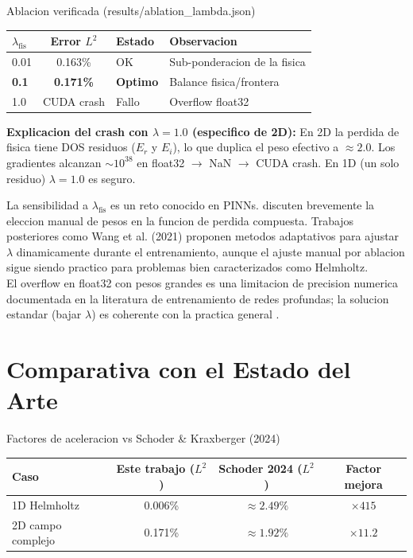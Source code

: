 \documentclass[12pt,a4paper]{article}
\begin{document}
\begin{resultbox}{Ablacion verificada (results/ablation\_lambda.json)}
\begin{tabular}{lcll}
\toprule
$\lambda_\text{fis}$ & Error $L^2$ & Estado & Observacion \\
\midrule
0.01 & 0.163\% & OK & Sub-ponderacion de la fisica \\
\textbf{0.1} & \textbf{0.171\%} & \textbf{Optimo} & Balance fisica/frontera \\
1.0 & CUDA crash & Fallo & Overflow float32 \\
\bottomrule
\end{tabular}

\vspace{4pt}
\textbf{Explicacion del crash con $\lambda = 1.0$ (especifico de 2D):}
En 2D la perdida de fisica tiene DOS residuos ($E_r$ y $E_i$), lo que duplica
el peso efectivo a $\approx2.0$. Los gradientes alcanzan $\sim10^{38}$ en float32
$\to$ NaN $\to$ CUDA crash. En 1D (un solo residuo) $\lambda=1.0$ es seguro.
\end{resultbox}

\begin{litbox}
La sensibilidad a $\lambda_\text{fis}$ es un reto conocido en PINNs.
\textcite{raissi2019} discuten brevemente la eleccion manual de pesos en la
funcion de perdida compuesta. Trabajos posteriores como Wang et al. (2021)
proponen metodos adaptativos para ajustar $\lambda$ dinamicamente durante el
entrenamiento, aunque el ajuste manual por ablacion sigue siendo practico para
problemas bien caracterizados como Helmholtz.\\[4pt]
El overflow en float32 con pesos grandes es una limitacion de precision numerica
documentada en la literatura de entrenamiento de redes profundas; la solucion
estandar (bajar $\lambda$) es coherente con la practica general \parencite{nocedal2006}.
\end{litbox}

\section{Comparativa con el Estado del Arte}

\begin{resultbox}{Factores de aceleracion vs Schoder \& Kraxberger (2024)}
\begin{tabular}{lccc}
\toprule
Caso & Este trabajo ($L^2$) & Schoder 2024 ($L^2$) & Factor mejora \\
\midrule
1D Helmholtz & 0.006\% & $\approx2.49\%$ & $\times415$ \\
2D campo complejo & 0.171\% & $\approx1.92\%$ & $\times11.2$ \\
\bottomrule
\end{tabular}
\end{resultbox}
\end{document}
